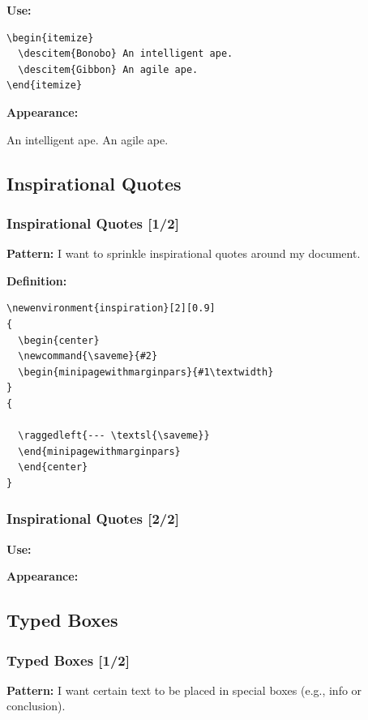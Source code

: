 {\begin{frame}[fragile]
  \vspace{2mm}
  \textbf{Use:}
  \begin{verbatim}
\begin{itemize}
  \descitem{Bonobo} An intelligent ape.
  \descitem{Gibbon} An agile ape.
\end{itemize}
  \end{verbatim}
  
  \vspace{2mm}
  \textbf{Appearance:}
  \begin{itemize}
     An intelligent ape.
     An agile ape.
  \end{itemize}
\end{frame}

\subsection{Inspirational Quotes}
\begin{frame}[fragile]
  \frametitle{Inspirational Quotes [1/2]}
  \vspace{3mm}
  \textbf{Pattern:} I want to sprinkle inspirational quotes around my document.
  
  \vspace{5mm}
  \textbf{Definition:}
  \begin{verbatim}
\newenvironment{inspiration}[2][0.9]
{
  \begin{center}
  \newcommand{\saveme}{#2}
  \begin{minipagewithmarginpars}{#1\textwidth}
}
{
  
  \raggedleft{--- \textsl{\saveme}}
  \end{minipagewithmarginpars}
  \end{center}
}
  \end{verbatim}
\end{frame}
\begin{frame}[fragile]
  \frametitle{Inspirational Quotes [2/2]}
  \vspace{3mm}
  \textbf{Use:}
  
  \vspace{5mm}
  \textbf{Appearance:}
\end{frame}

\subsection{Typed Boxes}
\begin{frame}[fragile]
  \frametitle{Typed Boxes [1/2]}
  \vspace{3mm}
  \textbf{Pattern:} I want certain text to be placed in special boxes (e.g., info or conclusion).
  

\end{frame}}
